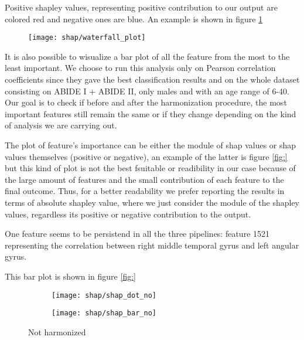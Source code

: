\documentclass[a4paper,11pt]{article}
\begin{document}
Positive shapley values, representing positive contribution to our output are colored red and negative ones are blue.
An example is shown in figure \ref{fig:shap_waterfall}

\begin{figure}[h]
\texttt{[image: shap/waterfall\_plot]}
\caption{}\label{fig:shap_waterfall}
\end{figure}


It is also possible to wisualize a bar plot of all the feature from the most to the least important.
We choose to run this analysis only on Pearson correlation coefficients since they gave the best classification results and on the whole dataset consisting on ABIDE I + ABIDE II, only males and with an age range of 6-40.
Our goal is to check if before and after the harmonization procedure, the most important features still remain the same or if they change depending on the kind of analysis we are carrying out.

The plot of feature's importance can be either the module of shap values or shap values themselves (positive or negative), an example of the latter is figure \ref{fig:} but this kind of plot is not the best fsuitable or readibility in our case because of the large amount of features and the small contribution of each feature to the final outcome.
Thus, for a better readability we prefer reporting the results in terms of absolute shapley value, where we just consider the module of the shapley values, regardless its positive or negative contribution to the output.

One feature seems to be persistend in all the three pipelines: feature 1521 representing the correlation between right middle temporal gyrus and left angular gyrus.

This bar plot is shown in figure \ref{fig:}

\begin{figure}
\centering
\begin{subfigure}[b]{.45\textwidth}
   \texttt{[image: shap/shap\_dot\_no]}
   \caption{}
   \label{}
\end{subfigure}
\begin{subfigure}[b]{.45\textwidth}
   \texttt{[image: shap/shap\_bar\_no]}
   \caption{}
   \label{}
\end{subfigure}
\caption{Not harmonized}
\label{}
\end{figure}
\end{document}
